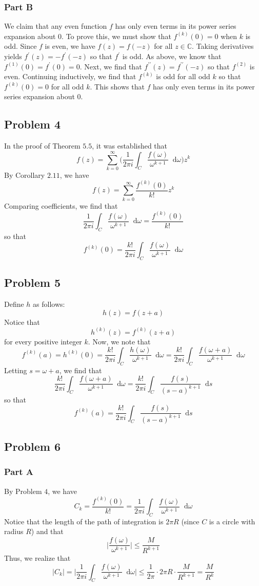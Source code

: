 \documentclass[12pt]{article}
\newcommand*\diff{\mathop{}\!\mathrm{d}}
\begin{document}
\subsubsection*{Part B} 
We claim that any even function $f$ has only even terms in its power series expansion about $0$. To prove this, we must show that $f^{(k)}(0) = 0$ when $k$ is odd. Since $f$ is even, we have $f(z) = f(-z)$ for all $z \in \mathbb{C}$. Taking derivatives yields $f^\prime(z) = -f^\prime(-z)$ so that $f^\prime$ is odd. As above, we know that $f^{(1)}(0) = f^\prime(0) = 0$. Next, we find that $f^{\prime\prime}(z) = f^{\prime\prime}(-z)$ so that $f^{(2)}$ is even. Continuing inductively, we find that $f^{(k)}$ is odd for all odd $k$ so that $f^{(k)}(0) = 0$ for all odd $k$. This shows that $f$ has only even terms in its power series expansion about $0$.
\newpage
\subsection*{Problem 4}
In the proof of Theorem $5.5$, it was established that
\[
f(z) = \sum_{k=0}^\infty \Bigg( \frac{1}{2\pi i }  \int_C \frac{f(\omega)}{\omega^{k+1}} \diff \omega \Bigg) z^k
\] By Corollary $2.11$, we have
\[
f(z) = \sum_{k=0}^\infty \frac{f^{(k)}(0)}{k!} z^k
\] Comparing coefficients, we find that
\[
\frac{1}{2\pi i } \int_C \frac{f(\omega)}{\omega^{k+1}} \diff \omega = \frac{f^{(k)}(0)}{k!}
\] so that
\[
f^{(k)}(0) = \frac{k!}{2\pi i} \int_C \frac{f(\omega)}{\omega^{k+1}} \diff \omega
\]
\newpage
\subsection*{Problem 5}
Define $h$ as follows:
\[
h(z) = f(z+a)
\] Notice that
\[
h^{(k)}(z) = f^{(k)}(z+a)
\] for every positive integer $k$. Now, we note that
\[
f^{(k)}(a) = h^{(k)}(0) = \frac{k!}{2\pi i} \int_C \frac{h(\omega)}{\omega^{k+1}} \diff \omega = \frac{k!}{2\pi i} \int_C \frac{f(\omega+a)}{\omega^{k+1}} \diff \omega
\] Letting $s = \omega+a$, we find that
\[
\frac{k!}{2\pi i} \int_C \frac{f(\omega+a)}{\omega^{k+1}} \diff \omega = \frac{k!}{2\pi i} \int_C \frac{f(s)}{(s-a)^{k+1}} \diff s
\] so that
\[
f^{(k)}(a) = \frac{k!}{2\pi i} \int_C \frac{f(s)}{(s-a)^{k+1}} \diff s
\]
\newpage
\subsection*{Problem 6}
\subsubsection*{Part A}
By Problem $4$, we have
\[
C_k = \frac{f^{(k)}(0)}{k!} = \frac{1}{2\pi i } \int_C \frac{f(\omega)}{\omega^{k+1}} \diff \omega
\] Notice that the length of the path of integration is $2\pi R$ (since $C$ is a circle with radius $R$) and that
\[
\bigg \vert \frac{f(\omega)}{\omega^{k+1}} \bigg \vert \leq \frac{M}{R^{k+1}}
\] Thus, we realize that
\[
\vert C_k \vert = \bigg \vert \frac{1}{2\pi i} \int_C \frac{f(\omega)}{\omega^{k+1}} \diff \omega \bigg \vert \leq \frac{1}{2 \pi} \cdot 2 \pi R \cdot \frac{M}{R^{k+1}} = \frac{M}{R^k} 
\]
\end{document}
